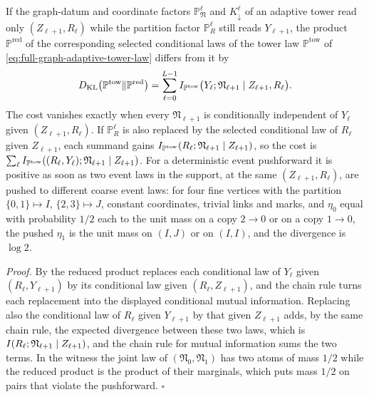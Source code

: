 If the graph-datum and coordinate factors $\mathbb P^\ell_{\mathfrak N}$ and
$K^\ell_\downarrow$ of an adaptive tower read only $(Z_{\ell+1},R_\ell)$ while the partition
factor $\mathbb P^\ell_R$ still reads $Y_{\ell+1}$, the
product $\mathbb P^{\mathrm{red}}$ of the corresponding selected conditional laws of
the tower law $\mathbb P^{\mathrm{tow}}$ of \eqref{eq:full-graph-adaptive-tower-law}
differs from it by
\begin{equation}
D_{\mathrm{KL}}\bigl(\mathbb P^{\mathrm{tow}}\Vert\mathbb P^{\mathrm{red}}\bigr)
=\sum_{\ell=0}^{L-1}
I_{\mathbb P^{\mathrm{tow}}}\bigl(Y_\ell;\mathfrak N_{\ell+1}\mid Z_{\ell+1},R_\ell\bigr).
\label{eq:full-graph-dropped-datum-cost}
\end{equation}
The cost vanishes exactly when every $\mathfrak N_{\ell+1}$ is conditionally
independent of $Y_\ell$ given $(Z_{\ell+1},R_\ell)$. If $\mathbb P^\ell_R$ is also replaced by
the selected conditional law of $R_\ell$ given $Z_{\ell+1}$, each summand gains
$I_{\mathbb P^{\mathrm{tow}}}(R_\ell;\mathfrak N_{\ell+1}\mid Z_{\ell+1})$, so the cost is
$\sum_\ell I_{\mathbb P^{\mathrm{tow}}}((R_\ell,Y_\ell);\mathfrak N_{\ell+1}\mid Z_{\ell+1})$. For a deterministic event
pushforward it is positive as soon as two event laws in the support, at the same
$(Z_{\ell+1},R_\ell)$, are pushed to different coarse event laws: for four fine
vertices with the partition $\{0,1\}\mapsto I$, $\{2,3\}\mapsto J$, constant
coordinates, trivial links and marks, and $\eta_0$ equal with probability $1/2$ each
to the unit mass on a copy $2\to0$ or on a copy $1\to0$, the pushed $\eta_1$ is the
unit mass on $(I,J)$ or on $(I,I)$, and the divergence is $\log2$.

\noindent\emph{Proof.}
By  the reduced product replaces each
conditional law of $Y_\ell$ given $(R_\ell,Y_{\ell+1})$ by its conditional law given
$(R_\ell,Z_{\ell+1})$, and the chain rule  turns each
replacement into the displayed conditional mutual information. Replacing also the
conditional law of $R_\ell$ given $Y_{\ell+1}$ by that given $Z_{\ell+1}$ adds, by the same chain
rule, the expected divergence between these two laws, which is
$I(R_\ell;\mathfrak N_{\ell+1}\mid Z_{\ell+1})$, and the chain rule for mutual information
sums the two terms. In the witness the
joint law of $(\mathfrak N_0,\mathfrak N_1)$ has two atoms of mass $1/2$ while the
reduced product is the product of their marginals, which puts mass $1/2$ on pairs
that violate the pushforward. $\square$

